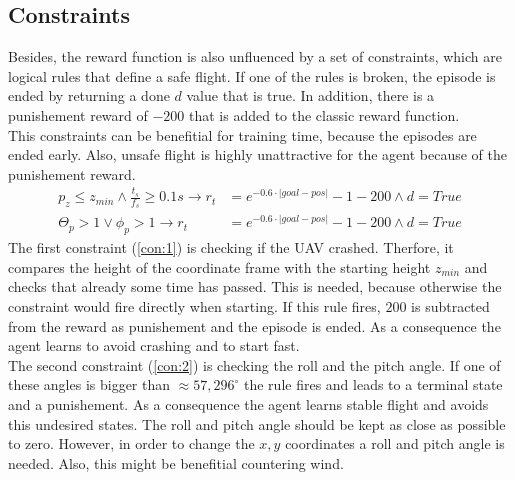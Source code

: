 \subsection{Constraints}
Besides, the reward function is also unfluenced by a set of constraints, which are logical rules that define a safe flight. If one of the rules is broken, the episode is ended by returning a done $d$ value that is true. In addition, there is a punishement reward of $-200$ that is added to the classic reward function.\\
This constraints can be benefitial for training time, because the episodes are ended early. Also, unsafe flight is highly unattractive for the agent because of the punishement reward. 
\begin{align}
	p_{z} \leq z_{min} \land \frac{t_s}{f_s} \geq 0.1 s \to r_t &= e^{-0.6 \cdot |goal - pos|} - 1 -200 \land d = True \label{con:1}\\
	\Theta_p > 1 \lor \phi_p > 1 \to r_t &= e^{-0.6 \cdot |goal - pos|} - 1 -200 \land d = True \label{con:2}
\end{align}
The first constraint (\cref{con:1}) is checking if the UAV crashed. Therfore, it compares the height of the coordinate frame with the starting height $z_{min}$ and checks that already some time has passed. This is needed, because otherwise the constraint would fire directly when starting. If this rule fires, $200$ is subtracted from the reward as punishement and the episode is ended. 
As a consequence the agent learns to avoid crashing and to start fast.\\
The second constraint (\cref{con:2}) is checking the roll and the pitch angle. If one of these angles is bigger than $\approx 57,296^{\circ}$ the rule fires and leads to a terminal state and a punishement. As a consequence the agent learns stable flight and avoids this undesired states. The roll and pitch angle should be kept as close as possible to zero. However, in order to change the $x,y$ coordinates a roll and pitch angle is needed. Also, this might be benefitial countering wind.

\newpage

